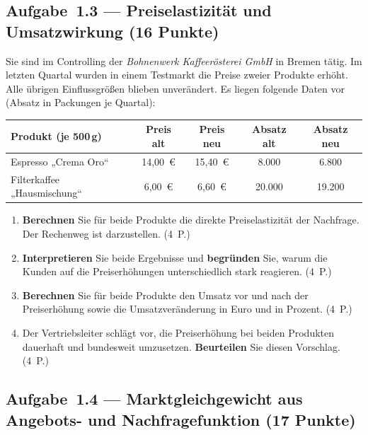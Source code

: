 \subsection*{Aufgabe~1.3 --- Preiselastizität und Umsatzwirkung (16 Punkte)}

Sie sind im Controlling der \emph{Bohnenwerk Kaffeerösterei GmbH} in Bremen tätig. Im
letzten Quartal wurden in einem Testmarkt die Preise zweier Produkte erhöht. Alle übrigen
Einflussgrößen blieben unverändert. Es liegen folgende Daten vor (Absatz in Packungen je
Quartal):

\begin{center}
\begin{tabular}{l c c c c}
\toprule
\rowcolor{bfwTabHead}
\textbf{Produkt (je 500\,g)} & \textbf{Preis alt} & \textbf{Preis neu} & \textbf{Absatz alt} & \textbf{Absatz neu}\\
\midrule
Espresso „Crema Oro`` & 14,00~€ & 15,40~€ & 8.000 & 6.800\\
Filterkaffee „Hausmischung`` & 6,00~€ & 6,60~€ & 20.000 & 19.200\\
\bottomrule
\end{tabular}
\end{center}

\begin{enumerate}[label=\alph*)]
  \item \textbf{Berechnen} Sie für beide Produkte die direkte Preiselastizität der
    Nachfrage. Der Rechenweg ist darzustellen. \hfill (4~P.)
  \item \textbf{Interpretieren} Sie beide Ergebnisse und \textbf{begründen} Sie, warum
    die Kunden auf die Preiserhöhungen unterschiedlich stark reagieren. \hfill (4~P.)
  \item \textbf{Berechnen} Sie für beide Produkte den Umsatz vor und nach der
    Preiserhöhung sowie die Umsatzveränderung in Euro und in Prozent. \hfill (4~P.)
  \item Der Vertriebsleiter schlägt vor, die Preiserhöhung bei beiden Produkten dauerhaft
    und bundesweit umzusetzen. \textbf{Beurteilen} Sie diesen Vorschlag. \hfill (4~P.)
\end{enumerate}

\subsection*{Aufgabe~1.4 --- Marktgleichgewicht aus Angebots- und Nachfragefunktion (17 Punkte)}

